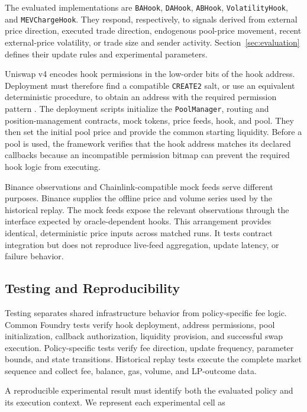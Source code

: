 \documentclass[a4paper,conference]{IEEEtran}
\begin{document}
The evaluated implementations are \texttt{BAHook}, \texttt{DAHook},
\texttt{ABHook}, \texttt{VolatilityHook}, and
\texttt{MEVChargeHook}. They respond, respectively, to signals derived
from external price direction, executed trade direction, endogenous
pool-price movement, recent external-price volatility, or trade size
and sender activity. Section~\ref{sec:evaluation} defines their update
rules and experimental parameters.

Uniswap v4 encodes hook permissions in the low-order bits of the hook
address. Deployment must therefore find a compatible
\texttt{CREATE2} salt, or use an equivalent deterministic procedure,
to obtain an address with the required permission pattern
\cite{uniswapHookDeployment}. The deployment scripts initialize the
\texttt{PoolManager}, routing and position-management contracts, mock
tokens, price feeds, hook, and pool. They then set the initial pool
price and provide the common starting liquidity. Before a pool is
used, the framework verifies that the hook address matches its declared
callbacks because an incompatible permission bitmap can prevent the
required hook logic from executing.

Binance observations and Chainlink-compatible mock feeds serve
different purposes. Binance supplies the offline price and volume
series used by the historical replay. The mock feeds expose the
relevant observations through the interface expected by
oracle-dependent hooks. This arrangement provides identical,
deterministic price inputs across matched runs. It tests contract
integration but does not reproduce live-feed aggregation, update
latency, or failure behavior.

\subsection{Testing and Reproducibility}

Testing separates shared infrastructure behavior from policy-specific
fee logic. Common Foundry tests verify hook deployment, address
permissions, pool initialization, callback authorization, liquidity
provision, and successful swap execution. Policy-specific tests verify
fee direction, update frequency, parameter bounds, and state
transitions. Historical replay tests execute the complete market
sequence and collect fee, balance, gas, volume, and LP-outcome data.

A reproducible experimental result must identify both the evaluated
policy and its execution context. We represent each experimental cell
as
\end{document}
